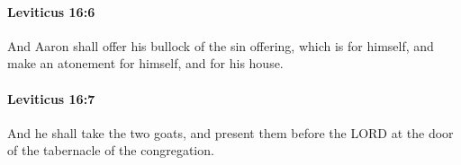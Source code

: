 		\paragraph{Leviticus 16:6} %
			\label{LEVITICUS-16-6}

			And Aaron shall offer his bullock of the sin offering, which is for himself, and make an atonement for himself, and for his house.


		\paragraph{Leviticus 16:7} %
			\label{LEVITICUS-16-7}

			And he shall take the two goats, and present them before the LORD at the door of the tabernacle of the congregation.


